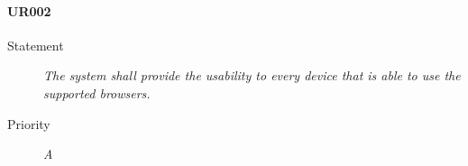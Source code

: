 \paragraph{UR002}
  \begin{description}
  \item [Statement] 
    \textit{ The system shall provide the usability to every device that is able to use the supported browsers.}
  \item [Priority] \textit{A}
\end{description}